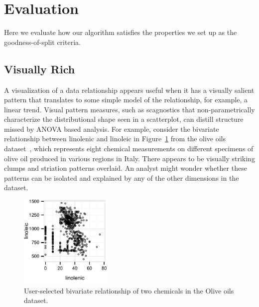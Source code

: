 \section{Evaluation}
\label{sec:evaluation}
Here we evaluate how our algorithm satisfies the properties we set up as the goodness-of-split criteria.

\subsection{Visually Rich}

A visualization of a data relationship appears useful when it has a visually salient pattern that translates to some simple model of the relationship, for example, a linear trend. Visual pattern measures, such as scagnostics that non-parametrically characterize the distributional shape seen in a scatterplot, can distill structure missed by ANOVA based analysis. For example, consider the bivariate relationship between linolenic and linoleic in Figure~\ref{fig:vrich_all} from the olive oils dataset~\cite{Forina1983}, which represents eight chemical measurements on different specimens of olive oil produced in various regions in Italy. There appears to be visually striking clumps and striation patterns overlaid. An analyst might wonder whether these patterns can be isolated and explained by any of the other dimensions in the dataset.

\begin{figure}
 \centering 
	\includegraphics[width=1.75in]{images/linolenic-linoleic.pdf}
	  \caption{User-selected bivariate relationship of two chemicals in the Olive oils dataset. }
	 \label{fig:vrich_all}
\end{figure}

